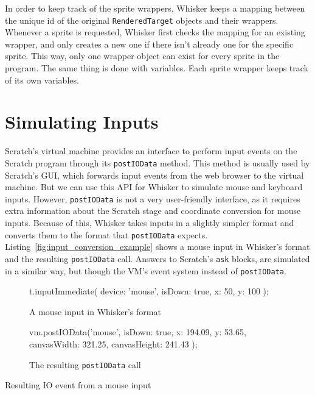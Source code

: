 In order to keep track of the sprite wrappers,
Whisker keeps a mapping between the unique id of the original \texttt{RenderedTarget} objects and their wrappers.
Whenever a sprite is requested, Whisker first checks the mapping for an existing wrapper,
and only creates a new one if there isn't already one for the specific sprite.
This way, only one wrapper object can exist for every sprite in the program.
The same thing is done with variables.
Each sprite wrapper keeps track of its own variables.

\section{Simulating Inputs}
\label{sec:simulating_inputs}

Scratch's virtual machine provides an interface to perform input events on the Scratch program through its \texttt{postIOData} method.
This method is usually used by Scratch's GUI, which forwards input events from the web browser to the virtual machine.
But we can use this API for Whisker to simulate mouse and keyboard inputs.
However, \texttt{postIOData} is not a very user-friendly interface,
as it requires extra information about the Scratch stage and coordinate conversion for mouse inputs.
Because of this, Whisker takes inputs in a slightly simpler format and converts them to the format that \texttt{postIOData} expects.
Listing~\ref{fig:input_conversion_example} shows a mouse input in Whisker's format and the resulting \texttt{postIOData} call.
Answers to Scratch's \texttt{ask} blocks, are simulated in a similar way, but though the VM's event system instead of \texttt{postIOData}.
\parspace

\begin{listing}[htpb]
    \centering

    \begin{subfigure}[b]{.25\textwidth}
        \begin{javascriptcode}
            t.inputImmediate({
                device: 'mouse',
                isDown: true,
                x: 50,
                y: 100
            });
        \end{javascriptcode}
        \vspace{-\bigskipamount}
        \caption{A mouse input in Whisker's format}
    \end{subfigure}
    \hspace{.08\textwidth}
    \begin{subfigure}[b]{.3\textwidth}
        \begin{javascriptcode}
            vm.postIOData('mouse', {
                isDown: true,
                x: 194.09,
                y: 53.65,
                canvasWidth: 321.25,
                canvasHeight: 241.43
            });
        \end{javascriptcode}
        \vspace{-\bigskipamount}
        \caption{The resulting \texttt{postIOData} call}
    \end{subfigure}

    \caption{Resulting IO event from a mouse input}
    \label{fig:input_conversion_example}
\end{listing}


